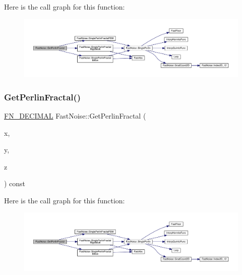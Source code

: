 Here is the call graph for this function\+:
\nopagebreak
\begin{figure}[H]
\begin{center}
\leavevmode
\includegraphics[width=350pt]{class_fast_noise_adc266f882b7128f39770bc79eae6b872_cgraph}
\end{center}
\end{figure}
\mbox{\label{class_fast_noise_a6f4a364104bbc65cda5135a904737de9}} 
\subsubsection{\texorpdfstring{Get\+Perlin\+Fractal()}{GetPerlinFractal()}\hspace{0.1cm}{\footnotesize\ttfamily [2/2]}}
{\footnotesize\ttfamily \mbox{\hyperlink{_fast_noise_8h_a75a9ef6d2541c4921815b885bfd449c3}{F\+N\+\_\+\+D\+E\+C\+I\+M\+AL}} Fast\+Noise\+::\+Get\+Perlin\+Fractal (\begin{DoxyParamCaption}\item[{\mbox{\hyperlink{_fast_noise_8h_a75a9ef6d2541c4921815b885bfd449c3}{F\+N\+\_\+\+D\+E\+C\+I\+M\+AL}}}]{x,  }\item[{\mbox{\hyperlink{_fast_noise_8h_a75a9ef6d2541c4921815b885bfd449c3}{F\+N\+\_\+\+D\+E\+C\+I\+M\+AL}}}]{y,  }\item[{\mbox{\hyperlink{_fast_noise_8h_a75a9ef6d2541c4921815b885bfd449c3}{F\+N\+\_\+\+D\+E\+C\+I\+M\+AL}}}]{z }\end{DoxyParamCaption}) const}

Here is the call graph for this function\+:
\nopagebreak
\begin{figure}[H]
\begin{center}
\leavevmode
\includegraphics[width=350pt]{class_fast_noise_a6f4a364104bbc65cda5135a904737de9_cgraph}
\end{center}
\end{figure}
\mbox{\label{class_fast_noise_ade53a483f6d63837f5be13867190363a}} 
